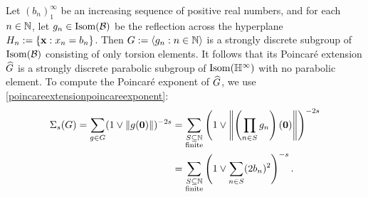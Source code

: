 \begin{example}
\label{exampleparabolictorsion}
Let $(b_n)_1^\infty$ be an increasing sequence of positive real numbers, and for each $n\in\N$, let $g_n\in\operatorname{Isom}(\mathcal B)$ be the reflection across the hyperplane $H_n := \{\mathbf x : x_n = b_n\}$. Then $G := \lb g_n:n\in\N\rb$ is a strongly discrete subgroup of $\operatorname{Isom}(\mathcal B)$ consisting of only torsion elements. It follows that its Poincar\'e extension $\widehat G$ is a strongly discrete parabolic subgroup of $\Isom(\H^\infty)$ with no parabolic element. 
To compute the Poincar\'e exponent of $\widehat G$, we use \eqref{poincareextensionpoincareexponent}:
\begin{align*}
\Sigma_s(G) = \sum_{g\in G} (1\vee \|g(\0)\|)^{-2s}
&= \sum_{\substack{S\subset\N \\ \text{finite}}} \left(1\vee \left\|\left(\prod_{n\in S} g_n\right)(\0)\right\|\right)^{-2s}\\
&= \sum_{\substack{S\subset\N \\ \text{finite}}} \left(1\vee \sum_{n\in S} (2b_n)^2\right)^{-s}.

\end{align*}
\end{example}
